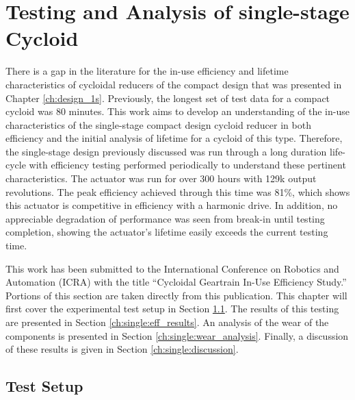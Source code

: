 
\chapter{Testing and Analysis of single-stage Cycloid}\label{ch:single}

There is a gap in the literature for the in-use efficiency and lifetime characteristics of cycloidal reducers of the compact design that was presented in Chapter \ref{ch:design_1s}. Previously, the longest set of test data for a compact cycloid was 80 minutes. This work aims to develop an understanding of the in-use characteristics of the single-stage compact design cycloid reducer in both efficiency and the initial analysis of lifetime for a cycloid of this type. Therefore, the single-stage design previously discussed was run through a long duration life-cycle with efficiency testing performed periodically to understand these pertinent characteristics. The actuator was run for over 300 hours with 129k output revolutions. The peak efficiency achieved through this time was 81\%, which shows this actuator is competitive in efficiency with a harmonic drive. In addition, no appreciable degradation of performance was seen from break-in until testing completion, showing the actuator's lifetime easily exceeds the current testing time.  

This work has been submitted to the International Conference on Robotics and Automation (ICRA) with the title ``Cycloidal Geartrain In-Use Efficiency Study.'' Portions of this section are taken directly from this publication. This chapter will first cover the experimental test setup in Section \ref{ch:single:test_setup}. The results of this testing are presented in Section \ref{ch:single:eff_results}. An analysis of the wear of the components is presented in Section \ref{ch:single:wear_analysis}. Finally, a discussion of these results is given in Section \ref{ch:single:discussion}.

\section{Test Setup} \label{ch:single:test_setup}

